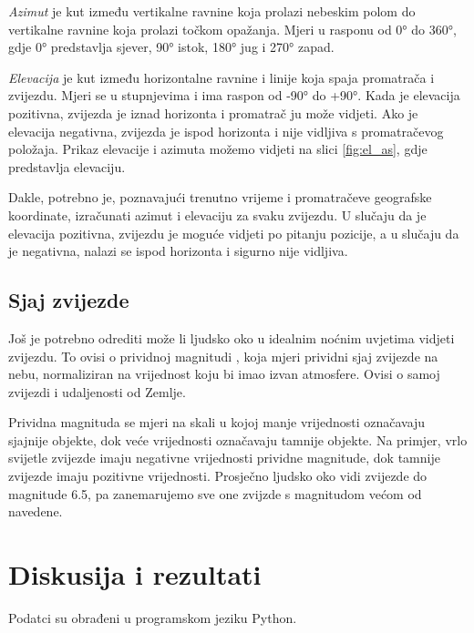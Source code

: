 \emph{Azimut} je kut između vertikalne ravnine koja prolazi nebeskim polom do vertikalne ravnine koja prolazi točkom opažanja. Mjeri u rasponu od 0° do 360°, gdje 0° predstavlja sjever, 90° istok, 180° jug i 270° zapad.

\emph{Elevacija} je kut između horizontalne ravnine i linije koja spaja promatrača i zvijezdu. Mjeri se u stupnjevima i ima raspon od -90° do +90°. Kada je elevacija pozitivna, zvijezda je iznad horizonta i promatrač ju može vidjeti. Ako je elevacija negativna, zvijezda je ispod horizonta i nije vidljiva s promatračevog položaja.
Prikaz elevacije i azimuta možemo vidjeti na slici \ref{fig:el_as}, gdje  predstavlja elevaciju.

Dakle, potrebno je, poznavajući trenutno vrijeme i promatračeve geografske koordinate, izračunati azimut i elevaciju za svaku zvijezdu. U slučaju da je elevacija pozitivna, zvijezdu je moguće vidjeti po pitanju pozicije, a u slučaju da je negativna, nalazi se ispod horizonta i sigurno nije vidljiva.

\subsection{Sjaj zvijezde}
Još je potrebno odrediti može li ljudsko oko u idealnim noćnim uvjetima vidjeti zvijezdu. To ovisi o prividnoj magnitudi \cite{ct:vmag}, koja mjeri prividni sjaj zvijezde na nebu, normaliziran na vrijednost koju bi imao izvan atmosfere. Ovisi o samoj zvijezdi i udaljenosti od Zemlje.

Prividna magnituda se mjeri na skali u kojoj manje vrijednosti označavaju sjajnije objekte, dok veće vrijednosti označavaju tamnije objekte. Na primjer, vrlo svijetle zvijezde imaju negativne vrijednosti prividne magnitude, dok tamnije zvijezde imaju pozitivne vrijednosti. Prosječno ljudsko oko vidi zvijezde do magnitude 6.5, pa zanemarujemo sve one zvijzde s magnitudom većom od navedene.


\section{Diskusija i rezultati}
Podatci su obrađeni u programskom jeziku Python.

